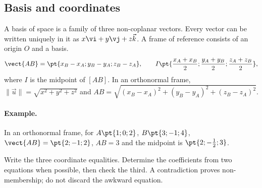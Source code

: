 \subsection{Basis and coordinates}
A basis of space is a family of three non-coplanar vectors. Every vector can be written uniquely in it as $x\vi +y\vj +z\vec k$. A frame of reference consists of an origin $O$ and a basis.
\[\vect{AB}=\pt{x_B-x_A;y_B-y_A;z_B-z_A},\qquad
I\pt{\frac{x_A+x_B}2;\frac{y_A+y_B}2;\frac{z_A+z_B}2},\]
where $I$ is the midpoint of $[AB]$.
In an orthonormal frame, $\|\vec u\|=\sqrt{x^2+y^2+z^2}$ and $AB=\sqrt{(x_B-x_A)^2+(y_B-y_A)^2+(z_B-z_A)^2}$.
\paragraph{Example.} In an orthonormal frame, for $A\pt{1;0;2}$, $B\pt{3;-1;4}$, $\vect{AB}=\pt{2;-1;2}$, $AB=3$ and the midpoint is $\pt{2;-\frac{1}{2};3}$.
\begin{method}
Write the three coordinate equalities. Determine the coefficients from two equations when possible, then check the third. A contradiction proves non-membership; do not discard the awkward equation.
\end{method}



\mxnewpage
